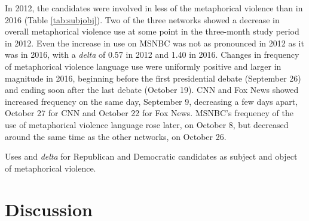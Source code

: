 In 2012, the candidates were involved in less of the metaphorical violence than
in 2016 (Table \ref{tab:subjobj}). Two of the three networks showed a decrease in overall metaphorical
violence use at some point in the three-month study period in 2012. Even the
increase in use on MSNBC was not as pronounced in 2012 as it was in 2016, with a
\emph{delta} of  0.57 in 2012 and 1.40 in 2016. Changes in frequency of
metaphorical violence language use were uniformly positive and larger in
magnitude in 2016, beginning before the first presidential debate (September 26)
and ending soon after the last debate (October 19). CNN and Fox News showed
increased frequency on the same day, September 9, decreasing a few days apart,
October 27 for CNN and October 22 for Fox News. MSNBC's frequency of the use of
metaphorical violence language rose later, on October 8, but decreased around
the same time as the other networks, on October 26. 

\begin{table}[!h]
  \vspace{.25in}
  \centering
  \begin{subtable}{\linewidth}
    \centering
    
    \caption{}
    \label{tab:subjobj-2012}
  \end{subtable}
  
  \vspace{.25in}

  \begin{subtable}{\linewidth}
    \centering
    
    \caption{}
    \label{tab:subjobj-2016}
  \end{subtable}

  \caption{Uses and \emph{delta} for Republican and Democratic candidates as
  subject and object of metaphorical violence.}
  \label{tab:subjobj}
\end{table}


\section{Discussion}

